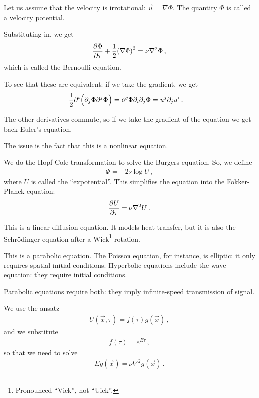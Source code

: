 \documentclass[main.tex]{subfiles}
\begin{document}

Let us assume that the velocity is irrotational: \(\vec{u} = \nabla \Phi \). The quantity \(\Phi \) is called a velocity potential. 

Substituting in, we get 
%
\begin{align}
\pdv{\Phi }{\tau } + \frac{1}{2} \qty(\nabla \Phi )^2 = \nu \nabla^2 \Phi 
\,,
\end{align}
%
which is called the Bernoulli equation.

To see that these are equivalent: if we take the gradient, we get 
%
\begin{align}
\frac{1}{2} \partial^{i}  \qty(\partial_{j} \Phi \partial^{j} \Phi )
&= \partial^{j} \Phi \partial_{i } \partial_{j} \Phi  
= u^{j} \partial_{j} u^{i}
\,.
\end{align}

The other derivatives commute, so if we take the gradient of the equation we get back Euler's equation.

The issue is the fact that this is a nonlinear equation.

We do the Hopf-Cole transformation to solve the Burgers equation. So, we define 
%
\begin{align}
\Phi = - 2 \nu \log U
\,,
\end{align}
%
where \(U\) is called the ``expotential''.
This simplifies the equation into the Fokker-Planck equation: 
%
\begin{align}
\pdv{U}{\tau } = \nu \nabla^2 U
\,.
\end{align}

This is a linear diffusion equation. It models heat transfer, but it is also the Schrödinger equation after a Wick\footnote{Pronounced ``Vick'', not ``Uick''. } rotation.

This is a parabolic equation. 
The Poisson equation, for instance, is elliptic: it only requires spatial initial conditions. Hyperbolic equations include the wave equation: they require initial conditions. 

Parabolic equations require both: they imply infinite-speed transmission of signal. 

We use the ansatz 
%
\begin{align}
U(\vec{x}, \tau ) = f(\tau ) g(\vec{x})
\,,
\end{align}
%
and we substitute 
%
\begin{align}
f(\tau ) = e^{E \tau }
\,,
\end{align}
%
so that we need to solve 
%
\begin{align}
E g(\vec{x}) = \nu \nabla^2 g(\vec{x})
\,.
\end{align}
\end{document}
